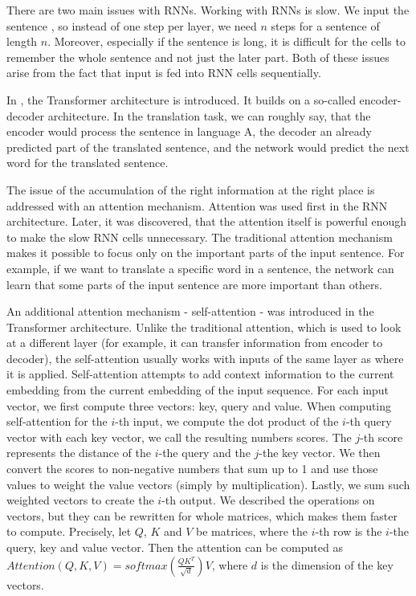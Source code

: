 There are two main issues with RNNs. Working with RNNs is slow. We input the sentence , so instead of one step per layer, we need $n$ steps for a sentence of length $n$. Moreover, especially if the sentence is long, it is difficult for the cells to remember the whole sentence and not just the later part. Both of these issues arise from the fact that input is fed into RNN cells sequentially. 

In \cite{vaswani2017attention}, the Transformer architecture is introduced. It builds on a so-called encoder-decoder architecture. In the translation task, we can roughly say, that the encoder would process the sentence in language A, the decoder an already predicted part of the translated sentence, and the network would predict the next word for the translated sentence.



The issue of the accumulation of the right information at the right place is addressed with an attention mechanism. Attention was used first in the RNN architecture. Later, it was discovered, that the attention itself is powerful enough to make the slow RNN cells unnecessary. The traditional attention mechanism makes it possible to focus only on the important parts of the input sentence. For example, if we want to translate a specific word in a sentence, the network can learn that some parts of the input sentence are more important than others. 

An additional attention mechanism - self-attention - was introduced in the Transformer architecture. Unlike the traditional attention, which is used to look at a different layer (for example, it can transfer information from encoder to decoder), the self-attention usually works with inputs of the same layer as where it is applied. Self-attention attempts to add context information to the current embedding from the current embedding of the input sequence. For each input vector, we first compute three vectors: key, query and value. When computing self-attention for the $i$-th input, we compute the dot product of the $i$-th query vector with each key vector, we call the resulting numbers scores. The $j$-th score represents the distance of the $i$-the query and the $j$-the key vector. We then convert the scores to non-negative numbers that sum up to 1 and use those values to weight the value vectors (simply by multiplication). Lastly, we sum such weighted vectors to create the $i$-th output. We described the operations on vectors, but they can be rewritten for whole matrices, which makes them faster to compute. Precisely, let $Q$, $K$ and $V$ be matrices, where the $i$-th row is the $i$-the query, key and value vector. Then the attention can be computed as $Attention(Q,K,V) = softmax(\frac{QK^{T}}{\sqrt{d}})V$, where $d$ is the dimension of the key vectors.


